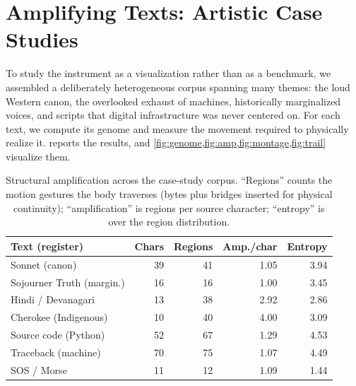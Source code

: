 \documentclass{vgtc}                          %
\begin{document}
\section{Amplifying Texts: Artistic Case Studies}
\label{sec:cases}

To study the instrument as a visualization rather than as a benchmark, we
assembled a deliberately heterogeneous corpus spanning many themes: the loud Western canon, the overlooked exhaust of machines,
historically marginalized voices, and scripts that digital infrastructure was
never centered on. For each text, we compute its genome and measure the movement
required to physically realize it.  reports the results, and
\cref{fig:genome,fig:amp,fig:montage,fig:trail} visualize them.

\begin{table}[tb]
\caption{Structural amplification across the case-study corpus. ``Regions'' counts
the motion gestures the body traverses (bytes plus bridges inserted for physical
continuity); ``amplification'' is regions per source character; ``entropy'' is over
the region distribution.}
\label{tab:cases}
\centering
\footnotesize
\setlength{\tabcolsep}{4.5pt}
\begin{tabular}{@{}lrrrr@{}}
\toprule
Text (register)            & Chars & Regions & Amp./char & Entropy \\
\midrule
Sonnet (canon)             & 39 & 41 & 1.05 & 3.94 \\
Sojourner Truth (margin.)  & 16 & 16 & 1.00 & 3.45 \\
Hindi / Devanagari         & 13 & 38 & 2.92 & 2.86 \\
Cherokee (Indigenous)      & 10 & 40 & 4.00 & 3.09 \\
Source code (Python)       & 52 & 67 & 1.29 & 4.53 \\
Traceback (machine)        & 70 & 75 & 1.07 & 4.49 \\
SOS / Morse                & 11 & 12 & 1.09 & 1.44 \\
\bottomrule
\end{tabular}
\end{table}
\end{document}
